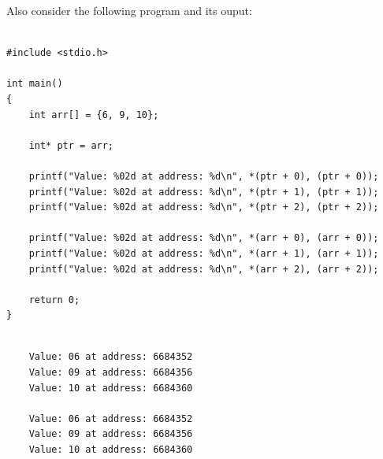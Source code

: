 \documentclass[12pt]{article}
\begin{document}
\begin{table}[H]
\end{table}

\newpage

\noindent Also consider the following program and its ouput:

\begin{verbatim}

#include <stdio.h>

int main()
{
    int arr[] = {6, 9, 10};

    int* ptr = arr;

    printf("Value: %02d at address: %d\n", *(ptr + 0), (ptr + 0));
    printf("Value: %02d at address: %d\n", *(ptr + 1), (ptr + 1));
    printf("Value: %02d at address: %d\n", *(ptr + 2), (ptr + 2));

    printf("Value: %02d at address: %d\n", *(arr + 0), (arr + 0));
    printf("Value: %02d at address: %d\n", *(arr + 1), (arr + 1));
    printf("Value: %02d at address: %d\n", *(arr + 2), (arr + 2));

    return 0;
}

\end{verbatim}

\vspace{1cm}

\begin{verbatim}

    Value: 06 at address: 6684352
    Value: 09 at address: 6684356
    Value: 10 at address: 6684360

    Value: 06 at address: 6684352
    Value: 09 at address: 6684356
    Value: 10 at address: 6684360
        
\end{verbatim}
\end{document}
